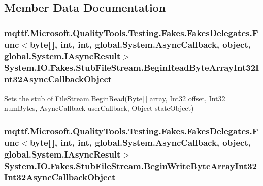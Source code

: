 \subsection{Member Data Documentation}
\hypertarget{class_system_1_1_i_o_1_1_fakes_1_1_stub_file_stream_a6e34735a4b3f7a34cfd338de13226749}{
\subsubsection[{Begin\-Read\-Byte\-Array\-Int32\-Int32\-Async\-Callback\-Object}]{\setlength{\rightskip}{0pt plus 5cm}mqttf.\-Microsoft.\-Quality\-Tools.\-Testing.\-Fakes.\-Fakes\-Delegates.\-Func$<$byte\mbox{[}$\,$\mbox{]}, int, int, global.\-System.\-Async\-Callback, object, global.\-System.\-I\-Async\-Result$>$ System.\-I\-O.\-Fakes.\-Stub\-File\-Stream.\-Begin\-Read\-Byte\-Array\-Int32\-Int32\-Async\-Callback\-Object}}\label{class_system_1_1_i_o_1_1_fakes_1_1_stub_file_stream_a6e34735a4b3f7a34cfd338de13226749}


Sets the stub of File\-Stream.\-Begin\-Read(\-Byte\mbox{[}$\,$\mbox{]} array, Int32 offset, Int32 num\-Bytes, Async\-Callback user\-Callback, Object state\-Object)

\hypertarget{class_system_1_1_i_o_1_1_fakes_1_1_stub_file_stream_aec3cd47c26054ba35aca287b0229091f}{
\subsubsection[{Begin\-Write\-Byte\-Array\-Int32\-Int32\-Async\-Callback\-Object}]{\setlength{\rightskip}{0pt plus 5cm}mqttf.\-Microsoft.\-Quality\-Tools.\-Testing.\-Fakes.\-Fakes\-Delegates.\-Func$<$byte\mbox{[}$\,$\mbox{]}, int, int, global.\-System.\-Async\-Callback, object, global.\-System.\-I\-Async\-Result$>$ System.\-I\-O.\-Fakes.\-Stub\-File\-Stream.\-Begin\-Write\-Byte\-Array\-Int32\-Int32\-Async\-Callback\-Object}}\label{class_system_1_1_i_o_1_1_fakes_1_1_stub_file_stream_aec3cd47c26054ba35aca287b0229091f}


